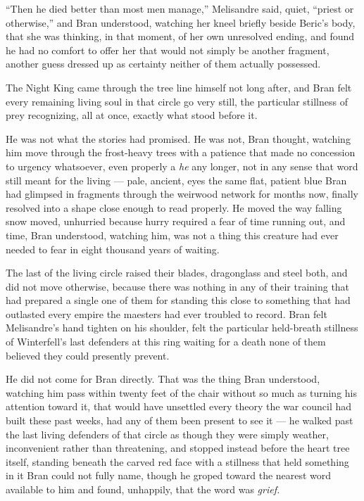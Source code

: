 “Then he died better than most men manage,” Melisandre said, quiet, “priest or otherwise,” and Bran understood, watching her kneel briefly beside Beric’s body, that she was thinking, in that moment, of her own unresolved ending, and found he had no comfort to offer her that would not simply be another fragment, another guess dressed up as certainty neither of them actually possessed.

\sceneBreak

The Night King came through the tree line himself not long after, and Bran felt every remaining living soul in that circle go very still, the particular stillness of prey recognizing, all at once, exactly what stood before it.

He was not what the stories had promised. He was not, Bran thought, watching him move through the frost-heavy trees with a patience that made no concession to urgency whatsoever, even properly a \textit{he} any longer, not in any sense that word still meant for the living — pale, ancient, eyes the same flat, patient blue Bran had glimpsed in fragments through the weirwood network for months now, finally resolved into a shape close enough to read properly. He moved the way falling snow moved, unhurried because hurry required a fear of time running out, and time, Bran understood, watching him, was not a thing this creature had ever needed to fear in eight thousand years of waiting.

The last of the living circle raised their blades, dragonglass and steel both, and did not move otherwise, because there was nothing in any of their training that had prepared a single one of them for standing this close to something that had outlasted every empire the maesters had ever troubled to record. Bran felt Melisandre’s hand tighten on his shoulder, felt the particular held-breath stillness of Winterfell’s last defenders at this ring waiting for a death none of them believed they could presently prevent.

He did not come for Bran directly. That was the thing Bran understood, watching him pass within twenty feet of the chair without so much as turning his attention toward it, that would have unsettled every theory the war council had built these past weeks, had any of them been present to see it — he walked past the last living defenders of that circle as though they were simply weather, inconvenient rather than threatening, and stopped instead before the heart tree itself, standing beneath the carved red face with a stillness that held something in it Bran could not fully name, though he groped toward the nearest word available to him and found, unhappily, that the word was \textit{grief.}

